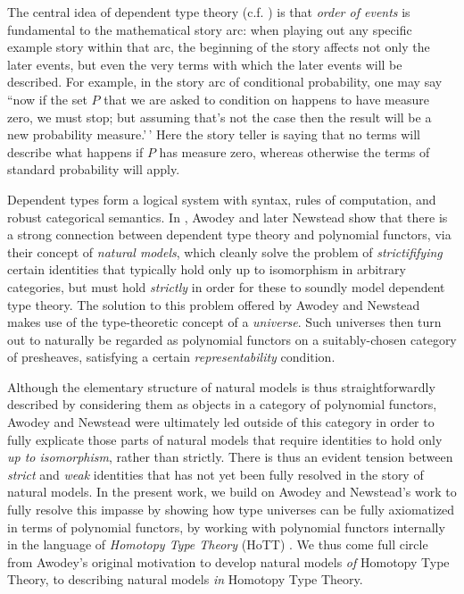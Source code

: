 \documentclass[
  11pt,
  oneside,
  article]{memoir}
\theoremstyle{definition}
\theoremstyle{plain}
\newcommand{\0}{\textsf{0}}
\newcommand{\1}{\tn{\textsf{1}}}
\begin{document}
The central idea of dependent type theory (c.f.
\cite{martin-lof1975intuitionistic}) is that \emph{order of events} is
fundamental to the mathematical story arc: when playing out any specific
example story within that arc, the beginning of the story affects not
only the later events, but even the very terms with which the later
events will be described. For example, in the story arc of conditional
probability, one may say ``now if the set \(P\) that we are asked to
condition on happens to have measure zero, we must stop; but assuming
that's not the case then the result will be a new probability
measure.'\,' Here the story teller is saying that no terms will describe
what happens if \(P\) has measure zero, whereas otherwise the terms of
standard probability will apply.

Dependent types form a logical system with syntax, rules of computation,
and robust categorical semantics. In
\cite{awodey2014natural,awodey2018polynomial}, Awodey and later Newstead
show that there is a strong connection between dependent type theory and
polynomial functors, via their concept of \emph{natural models}, which
cleanly solve the problem of \emph{strictififying} certain identities
that typically hold only up to isomorphism in arbitrary categories, but
must hold \emph{strictly} in order for these to soundly model dependent
type theory. The solution to this problem offered by Awodey and Newstead
makes use of the type-theoretic concept of a \emph{universe}. Such
universes then turn out to naturally be regarded as polynomial functors
on a suitably-chosen category of presheaves, satisfying a certain
\emph{representability} condition.

Although the elementary structure of natural models is thus
straightforwardly described by considering them as objects in a category
of polynomial functors, Awodey and Newstead were ultimately led outside
of this category in order to fully explicate those parts of natural
models that require identities to hold only \emph{up to isomorphism},
rather than strictly. There is thus an evident tension between
\emph{strict} and \emph{weak} identities that has not yet been fully
resolved in the story of natural models. In the present work, we build
on Awodey and Newstead's work to fully resolve this impasse by showing
how type universes can be fully axiomatized in terms of polynomial
functors, by working with polynomial functors internally in the language
of \emph{Homotopy Type Theory} (HoTT) \cite{Voevodsky:2013a}. We thus
come full circle from Awodey's original motivation to develop natural
models \emph{of} Homotopy Type Theory, to describing natural models
\emph{in} Homotopy Type Theory.
\end{document}
